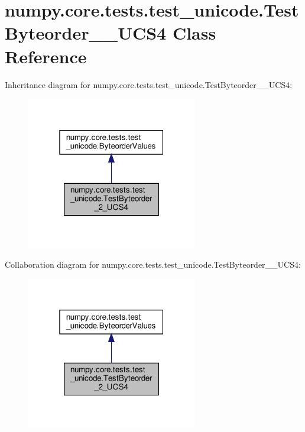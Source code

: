 \hypertarget{classnumpy_1_1core_1_1tests_1_1test__unicode_1_1TestByteorder__2__UCS4}{}\section{numpy.\+core.\+tests.\+test\+\_\+unicode.\+Test\+Byteorder\+\_\+\_\+\+U\+C\+S4 Class Reference}
\label{classnumpy_1_1core_1_1tests_1_1test__unicode_1_1TestByteorder__2__UCS4}


Inheritance diagram for numpy.\+core.\+tests.\+test\+\_\+unicode.\+Test\+Byteorder\+\_\+\_\+\+U\+C\+S4\+:
\nopagebreak
\begin{figure}[H]
\begin{center}
\leavevmode
\includegraphics[width=211pt]{classnumpy_1_1core_1_1tests_1_1test__unicode_1_1TestByteorder__2__UCS4__inherit__graph}
\end{center}
\end{figure}


Collaboration diagram for numpy.\+core.\+tests.\+test\+\_\+unicode.\+Test\+Byteorder\+\_\+\_\+\+U\+C\+S4\+:
\nopagebreak
\begin{figure}[H]
\begin{center}
\leavevmode
\includegraphics[width=211pt]{classnumpy_1_1core_1_1tests_1_1test__unicode_1_1TestByteorder__2__UCS4__coll__graph}
\end{center}
\end{figure}
